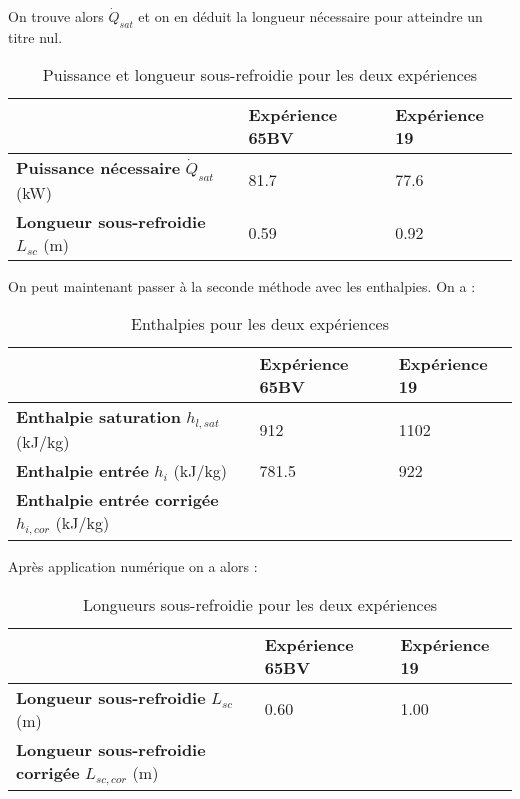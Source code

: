 On trouve alors $\dot{Q}_{sat}$ et on en déduit la longueur nécessaire pour atteindre un titre nul.
\begin{table}[H]
\caption{Puissance et longueur sous-refroidie pour les deux expériences}
\vspace{5pt}
    \centering
    \begin{tabular}{@{}lll@{}}
        \toprule
               & \textbf{Expérience 65BV}& \textbf{Expérience 19}\\
        \midrule
          \textbf{Puissance nécessaire} $\dot{Q}_{sat}$ (\si{kW}) & 81.7 & 77.6 \\
          \textbf{Longueur sous-refroidie} $L_{sc}$ (\si{m}) & 0.59 & 0.92 \\
        \bottomrule  
    \end{tabular}
    \label{donnes}
\end{table}

On peut maintenant passer à la seconde méthode avec les enthalpies. On a :
\begin{table}[H]
\caption{Enthalpies pour les deux expériences}
\vspace{5pt}
    \centering
    \begin{tabular}{@{}lll@{}}
        \toprule
               & \textbf{Expérience 65BV}& \textbf{Expérience 19}\\
        \midrule
          \textbf{Enthalpie saturation} $h_{l,sat}$ (\si{kJ/kg}) & 912 & 1102 \\
          \textbf{Enthalpie entrée} $h_{i}$ (\si{kJ/kg}) & 781.5 & 922 \\
          \textbf{Enthalpie entrée corrigée} $h_{i,cor}$ (\si{kJ/kg}) &  &  \\          
        \bottomrule  
    \end{tabular}
    \label{donnes}
\end{table}

Après application numérique on a alors :
\begin{table}[H]
\caption{Longueurs sous-refroidie pour les deux expériences}
\vspace{5pt}
    \centering
    \begin{tabular}{@{}lll@{}}
        \toprule
               & \textbf{Expérience 65BV}& \textbf{Expérience 19}\\
        \midrule
          \textbf{Longueur sous-refroidie} $L_{sc}$ (\si{m}) & 0.60 & 1.00 \\
          \textbf{Longueur sous-refroidie corrigée} $L_{sc,cor}$ (\si{m}) &  &  \\
        \bottomrule  
    \end{tabular}
    \label{donnes}
\end{table}

